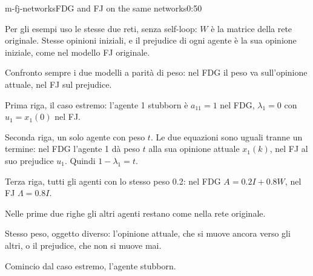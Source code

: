 \begin{slide}{m-fj-networks}{FDG and FJ on the same networks\nuova}{0:50}
  \begin{discorso}
    \item {\color{blue}Per gli esempi uso le stesse due reti, senza self-loop: $W$ è la matrice della rete originale. Stesse opinioni iniziali, e il prejudice di ogni agente è la sua opinione iniziale, come nel modello FJ originale.}
    \item {\color{blue}Confronto sempre i due modelli a parità di peso: nel FDG il peso va sull'opinione attuale, nel FJ sul prejudice.}
    \item {\color{blue}Prima riga, il caso estremo: l'agente 1 stubborn è $a_{11}=1$ nel FDG, $\lambda_1=0$ con $u_1=x_1(0)$ nel FJ.}
    \item {\color{blue}Seconda riga, un solo agente con peso $t$. Le due equazioni sono uguali tranne un termine: nel FDG l'agente 1 dà peso $t$ alla sua opinione attuale $x_1(k)$, nel FJ al suo prejudice $u_1$. Quindi $1-\lambda_1=t$.}
    \item {\color{blue}Terza riga, tutti gli agenti con lo stesso peso 0.2: nel FDG $A=0.2I+0.8W$, nel FJ $\Lambda=0.8I$.}
    \item {\color{blue}Nelle prime due righe gli altri agenti restano come nella rete originale.}
    \item {\color{blue}Stesso peso, oggetto diverso: l'opinione attuale, che si muove ancora verso gli altri, o il prejudice, che non si muove mai.}
    \item {\color{blue}Comincio dal caso estremo, l'agente stubborn.}
  \end{discorso}
\end{slide}

